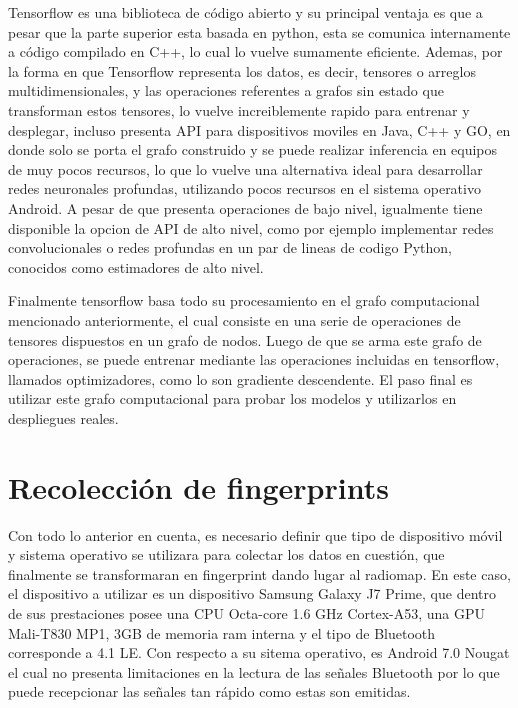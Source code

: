 Tensorflow es una biblioteca de código abierto y su principal ventaja es que a pesar que la parte superior esta basada en python, esta se comunica internamente a código compilado en C++, lo cual lo vuelve sumamente eficiente. Ademas, por la forma en que Tensorflow representa los datos, es decir, tensores o arreglos multidimensionales, y las operaciones referentes a grafos sin estado que transforman estos tensores, lo vuelve increiblemente rapido para entrenar y desplegar, incluso presenta API para dispositivos moviles en Java, C++ y GO, en donde solo se porta el grafo construido y se puede realizar inferencia en equipos de muy pocos recursos, lo que lo vuelve una alternativa ideal para desarrollar redes neuronales profundas, utilizando  pocos recursos en el sistema operativo Android. A pesar de que presenta operaciones de bajo nivel, igualmente tiene disponible la opcion de API de alto nivel, como por ejemplo implementar redes convolucionales o redes profundas en un par de lineas de codigo Python, conocidos como estimadores de alto nivel.

Finalmente tensorflow basa todo su procesamiento en el grafo computacional mencionado anteriormente, el cual consiste en una serie de operaciones de tensores dispuestos en un grafo de nodos. Luego de que se arma este grafo de operaciones, se puede entrenar mediante las operaciones incluidas en tensorflow, llamados optimizadores, como lo son gradiente descendente. El paso final es utilizar este grafo computacional para probar los modelos y utilizarlos en despliegues reales.


\section{Recolección de fingerprints}


Con todo lo anterior en cuenta, es necesario definir que tipo de dispositivo móvil y sistema operativo se utilizara para colectar los datos en cuestión, que finalmente se transformaran en fingerprint dando lugar al radiomap. En este caso, el dispositivo a utilizar es un dispositivo Samsung Galaxy J7 Prime, que dentro de sus prestaciones posee una CPU Octa-core 1.6 GHz Cortex-A53, una GPU Mali-T830 MP1, 3GB de memoria ram interna y el tipo de Bluetooth corresponde a 4.1 LE. Con respecto a su sitema operativo, es Android 7.0 Nougat el cual no presenta limitaciones en la lectura de las señales Bluetooth por lo que puede recepcionar las señales tan rápido como estas son emitidas.

